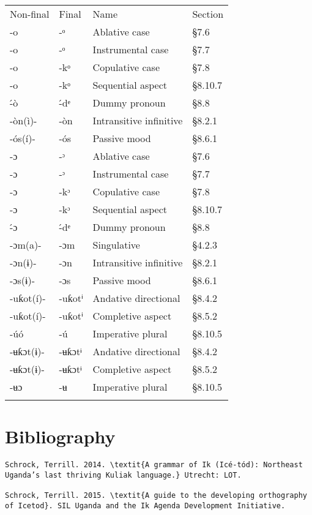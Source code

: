 \begin{tabularx}{\textwidth}{XXXX}
\lsptoprule

Non-final & Final & Name & Section\\
{}-o & {}-ᵒ & Ablative case & §7.6\\
{}-o & {}-ᵒ & Instrumental case & §7.7\\
{}-o & {}-kᵒ & Copulative case & §7.8\\
{}-o & {}-kᵒ & Sequential aspect & §8.10.7\\
{}\'{-}ò & {}\'{-}dᵉ & Dummy pronoun & §8.8\\
{}-òn(ì)- & {}-òn & Intransitive infinitive & §8.2.1\\
{}-ós(í)- & {}-ós & Passive mood & §8.6.1\\
{}-ɔ & {}-ᵓ & Ablative case & §7.6\\
{}-ɔ & {}-ᵓ & Instrumental case & §7.7\\
{}-ɔ & {}-kᵓ & Copulative case & §7.8\\
{}-ɔ & {}-kᵓ & Sequential aspect & §8.10.7\\
{}\'{-}ɔ & {}\'{-}dᵉ & Dummy pronoun & §8.8\\
{}-ɔm(a)- & {}-ɔm & Singulative & §4.2.3\\
{}-ɔn(ɨ)- & {}-ɔn & Intransitive infinitive & §8.2.1\\
{}-ɔs(ɨ)- & {}-ɔs & Passive mood & §8.6.1\\
{}-uƙot(í)- & {}-uƙotⁱ & Andative directional & §8.4.2\\
{}-uƙot(í)- & {}-uƙotⁱ & Completive aspect & §8.5.2\\
{}-úó & {}-ú & Imperative plural & §8.10.5\\
{}-ʉƙɔt(ɨ)- & {}-ʉƙɔtᶤ & Andative directional & §8.4.2\\
{}-ʉƙɔt(ɨ)- & {}-ʉƙɔtᶤ & Completive aspect & §8.5.2\\
{}-ʉɔ & {}-ʉ & Imperative plural & §8.10.5\\
\lspbottomrule
\end{tabularx}

\section{Bibliography}

\begin{verbatim} 
Schrock, Terrill. 2014. \textit{A grammar of Ik (Icé-tód): Northeast Uganda’s last thriving Kuliak language.} Utrecht: LOT.

Schrock, Terrill. 2015. \textit{A guide to the developing orthography of Icetod}. SIL Uganda and the Ik Agenda Development Initiative. 


\end{verbatim}